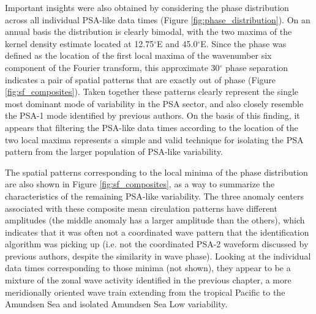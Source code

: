 Important insights were also obtained by considering the phase distribution across all individual PSA-like data times (Figure \ref{fig:phase_distribution}). On an annual basis the distribution is clearly bimodal, with the two maxima of the kernel density estimate located at 12.75$^{\circ}$E and 45.0$^{\circ}$E. Since the phase was defined as the location of the first local maxima of the wavenumber six component of the Fourier transform, this approximate 30$^{\circ}$ phase separation indicates a pair of spatial patterns that are exactly out of phase (Figure \ref{fig:sf_composites}). Taken together these patterns clearly represent the single most dominant mode of variability in the PSA sector, and also closely resemble the PSA-1 mode identified by previous authors. On the basis of this finding, it appears that filtering the PSA-like data times according to the location of the two local maxima represents a simple and valid technique for isolating the PSA pattern from the larger population of PSA-like variability. 

The spatial patterns corresponding to the local minima of the phase distribution are also shown in Figure \ref{fig:sf_composites}, as a way to summarize the characteristics of the remaining PSA-like variability. The three anomaly centers associated with these composite mean circulation patterns have different amplitudes (the middle anomaly has a larger amplitude than the others), which indicates that it was often not a coordinated wave pattern that the identification algorithm was picking up (i.e. not the coordinated PSA-2 waveform discussed by previous authors, despite the similarity in wave phase). Looking at the individual data times corresponding to those minima (not shown), they appear to be a mixture of the zonal wave activity identified in the previous chapter, a more meridionally oriented wave train extending from the tropical Pacific to the Amundsen Sea \citep[e.g.][]{Clem2015,Clem2015a} and isolated Amundsen Sea Low variability.


